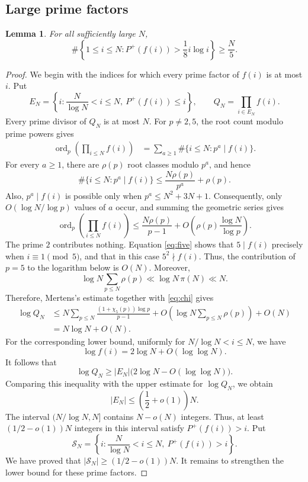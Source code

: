 \documentclass[11pt]{amsart}
\newtheorem{lemma}[theorem]{Lemma}
\theoremstyle{definition}
\theoremstyle{remark}
\begin{document}
\subsection{Large prime factors}

\begin{lemma}\label{lem:largeprime}
For all sufficiently large $N$,
\[
\#\left\{1\leq i\leq N:P^+(f(i))>\frac18 i\log i\right\}\geq\frac N5.
\]
\end{lemma}

\begin{proof}
We begin with the indices for which every prime factor of $f(i)$ is at
most $i$. Put
\[
E_N=\left\{i:\frac{N}{\log N}<i\leq N,\ P^+(f(i))\leq i\right\},
\qquad
Q_N=\prod_{i\in E_N}f(i).
\]
Every prime divisor of $Q_N$ is at most $N$.  For $p\neq2,5$, the root count
modulo prime powers gives
\begin{align*}
\operatorname{ord}_p\left(\prod_{i\leq N}f(i)\right)
&=\sum_{a\geq1}\#\{i\leq N:p^a\mid f(i)\}.
\end{align*}
For every $a\geq1$, there are $\rho(p)$ root classes modulo $p^a$, and hence
\[
\#\{i\leq N:p^a\mid f(i)\}
\leq \frac{N\rho(p)}{p^a}+\rho(p).
\]
Also, $p^a\mid f(i)$ is possible only when $p^a\leq N^2+3N+1$.
Consequently, only $O(\log N/\log p)$ values of $a$ occur, and summing the
geometric series gives
\[
\operatorname{ord}_p\left(\prod_{i\leq N}f(i)\right)
\leq
\frac{N\rho(p)}{p-1}
+O\left(\rho(p)\frac{\log N}{\log p}\right).
\]
The prime $2$ contributes nothing.  Equation \eqref{eq:five} shows that
$5\mid f(i)$ precisely when $i\equiv1\pmod5$, and that in this case
$5^2\nmid f(i)$.  Thus, the contribution of $p=5$ to the logarithm below is
$O(N)$.  Moreover,
\[
\log N\sum_{p\leq N}\rho(p)\ll \log N\,\pi(N)\ll N.
\]
Therefore, Mertens's estimate together with \eqref{eq:chi} gives
\begin{align*}
\log Q_N
&\leq
N\sum_{p\leq N}\frac{(1+\chi_5(p))\log p}{p-1}
+O\left(\log N\sum_{p\leq N}\rho(p)\right)+O(N)\\
&=N\log N+O(N).
\end{align*}
For the corresponding lower bound, uniformly for
$N/\log N<i\leq N$, we have
\[
\log f(i)=2\log N+O(\log\log N).
\]
It follows that
\[
\log Q_N
\geq |E_N|\bigl(2\log N-O(\log\log N)\bigr).
\]
Comparing this inequality with the upper estimate for $\log Q_N$, we obtain
\[
|E_N|\leq\left(\frac12+o(1)\right)N.
\]
The interval $(N/\log N,N]$ contains $N-o(N)$ integers.  Thus, at least
$(1/2-o(1))N$ integers in this interval satisfy $P^+(f(i))>i$.  Put
\[
\mathcal S_N=
\left\{i:\frac{N}{\log N}<i\leq N,\ P^+(f(i))>i\right\}.
\]
We have proved that $|\mathcal S_N|\geq(1/2-o(1))N$.  It remains to
strengthen the lower bound for these prime factors.


\end{proof}
\end{document}
